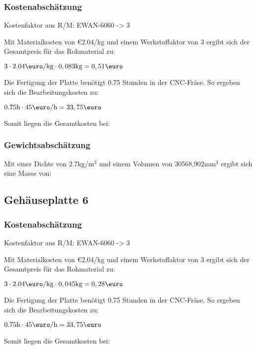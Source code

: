 \documentclass[10pt, a4paper]{article}
\begin{document}
\subsubsection{Kostenabschätzung}
\begin{center}
  Kostenfaktor aus R/M: EWAN-6060 -> 3
\end{center}
Mit Materialkosten von \euro2.04/kg und einem Werkstoffaktor von 3 ergibt sich der Gesamtpreis für das Rohmaterial zu: 
\begin{center}
    $3 \cdot 2.04\text{\euro/kg} \cdot 0,083\text{kg} = 0,51\text{\euro}$
\end{center}
Die Fertigung der Platte benötigt 0.75 Stunden in der CNC-Fräse. So ergeben sich die Bearbeitungskosten zu:
\begin{center}
  $0.75\text{h} \cdot 45\text{\euro/h}= 33,75\text{\euro}$
\end{center}
Somit liegen die Gesamtkosten bei:
\begin{flushright}
\end{flushright}
\subsubsection{Gewichtsabschätzung}
Mit einer Dichte von 2.7kg/m$^3$ und einem Volumen von 30568,902mm$^3$ ergibt sich eine Masse von:
\begin{flushright}
\end{flushright}

\newpage
\subsection{Gehäuseplatte 6}
\begin{figure}[h]
  \centering
  \vspace{-10pt}
\end{figure}
\subsubsection{Kostenabschätzung}
\begin{center}
  Kostenfaktor aus R/M: EWAN-6060 -> 3
\end{center}
Mit Materialkosten von \euro2.04/kg und einem Werkstoffaktor von 3 ergibt sich der Gesamtpreis für das Rohmaterial zu: 
\begin{center}
    $3 \cdot 2.04\text{\euro/kg} \cdot 0,045\text{kg} = 0,28\text{\euro}$
\end{center}
Die Fertigung der Platte benötigt 0.75 Stunden in der CNC-Fräse. So ergeben sich die Bearbeitungskosten zu:
\begin{center}
  $0.75\text{h} \cdot 45\text{\euro/h}= 33,75\text{\euro}$
\end{center}
Somit liegen die Gesamtkosten bei:
\begin{flushright}
\end{flushright}
\end{document}
